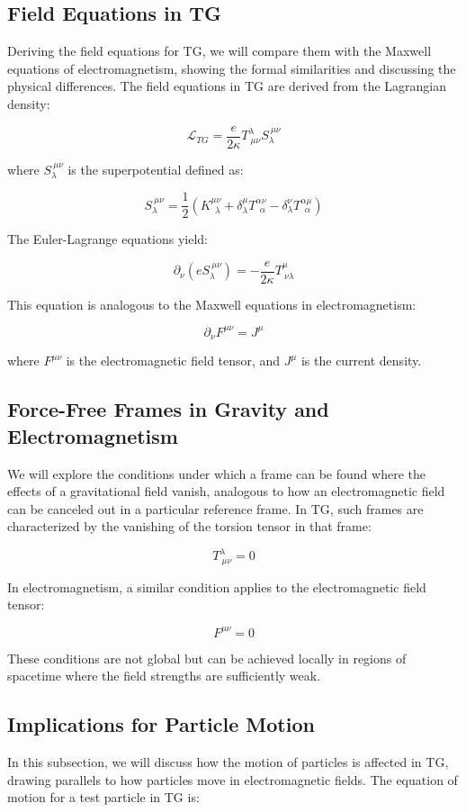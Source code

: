 \documentclass[12pt]{article}
\begin{document}
\subsection{Field Equations in TG}
Deriving the field equations for TG, we will compare them with the Maxwell equations of electromagnetism, showing the formal similarities and discussing the physical differences. The field equations in TG are derived from the Lagrangian density:

\[
\mathcal{L}_{TG} = \frac{e}{2\kappa} T^\lambda_{\ \mu\nu} S_\lambda^{\ \mu\nu}
\]

where \( S_\lambda^{\ \mu\nu} \) is the superpotential defined as:

\[
S_\lambda^{\ \mu\nu} = \frac{1}{2} \left( K^{\mu\nu}_{\ \ \lambda} + \delta^\mu_\lambda T^{\alpha\nu}_{\ \ \alpha} - \delta^\nu_\lambda T^{\alpha\mu}_{\ \ \alpha} \right)
\]

The Euler-Lagrange equations yield:

\[
\partial_\nu \left(e S_\lambda^{\ \mu\nu}\right) = -\frac{e}{2\kappa} T^\mu_{\ \nu\lambda}
\]

This equation is analogous to the Maxwell equations in electromagnetism:

\[
\partial_\nu F^{\mu\nu} = J^\mu
\]

where \( F^{\mu\nu} \) is the electromagnetic field tensor, and \( J^\mu \) is the current density.

\subsection{Force-Free Frames in Gravity and Electromagnetism}
We will explore the conditions under which a frame can be found where the effects of a gravitational field vanish, analogous to how an electromagnetic field can be canceled out in a particular reference frame. In TG, such frames are characterized by the vanishing of the torsion tensor in that frame:

\[
T^\lambda_{\ \mu\nu} = 0
\]

In electromagnetism, a similar condition applies to the electromagnetic field tensor:

\[
F^{\mu\nu} = 0
\]

These conditions are not global but can be achieved locally in regions of spacetime where the field strengths are sufficiently weak.

\subsection{Implications for Particle Motion}
In this subsection, we will discuss how the motion of particles is affected in TG, drawing parallels to how particles move in electromagnetic fields. The equation of motion for a test particle in TG is:
\end{document}
